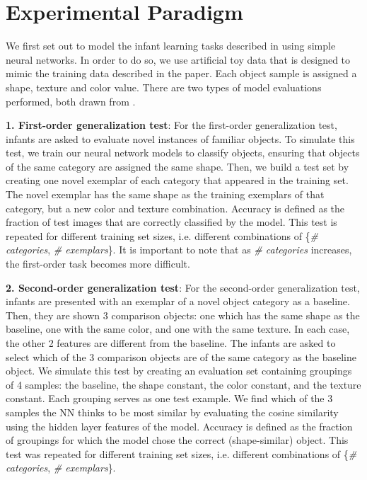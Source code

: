 \section{Experimental Paradigm}
\label{sec:experimental_paradigm}
We first set out to model the infant learning tasks described in
\citet{Smith2002} using simple neural networks. In order to do so, we use
artificial toy data that is designed to mimic the training data described in
the paper. Each object sample is assigned a shape, texture and color value.
There are two types of model evaluations performed, both drawn from
\cite{Smith2002}.

{\bf1. First-order generalization test}: For the first-order generalization
test, infants are asked to evaluate novel instances of familiar objects. To
simulate this test, we train our neural network models to classify objects,
ensuring that objects of the same category are assigned the same shape. Then,
we build a test set by creating one novel exemplar of each category that
appeared in the training set. The novel exemplar has the same shape as the
training exemplars of that category, but a new color and texture combination.
Accuracy is defined as the fraction of test images that are correctly
classified by the model. This test is repeated for different training set
sizes, i.e. different combinations of \{\textit{\# categories},
\textit{\# exemplars}\}. It is important to note that as \textit{\# categories}
increases, the first-order task becomes more difficult.

{\bf2. Second-order generalization test}: For the second-order generalization
test, infants are presented with an exemplar of a novel object category as a
baseline. Then, they are shown 3 comparison objects: one which has the same
shape as the baseline, one with the same color, and one with the same texture.
In each case, the other 2 features are different from the baseline. The infants
are asked to select which of the 3 comparison objects are of the same category
as the baseline object. We simulate this test by creating an evaluation set
containing groupings of 4 samples: the baseline, the shape constant, the color
constant, and the texture constant. Each grouping serves as one test example.
We find which of the 3 samples the NN thinks to be most similar by evaluating
the cosine similarity using the hidden layer features of the model. Accuracy is
defined as the fraction of groupings for which the model chose the correct
(shape-similar) object. This test was repeated for different training set
sizes, i.e. different combinations of \{\textit{\# categories},
\textit{\# exemplars}\}.

